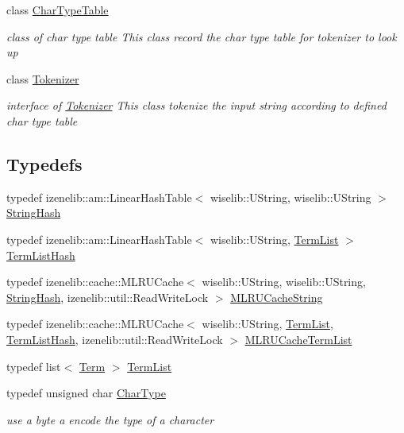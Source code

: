 \begin{CompactItemize}
class \hyperlink{classla__manager_1_1CharTypeTable}{CharTypeTable}
\begin{CompactList}\small\item\em class of char type table This class record the char type table for tokenizer to look up \item\end{CompactList}\item 
class \hyperlink{classla__manager_1_1Tokenizer}{Tokenizer}
\begin{CompactList}\small\item\em interface of \hyperlink{classla__manager_1_1Tokenizer}{Tokenizer} This class tokenize the input string according to defined char type table \item\end{CompactList}\end{CompactItemize}
\subsection*{Typedefs}
\begin{CompactItemize}
\item 
typedef izenelib::am::LinearHashTable$<$ wiselib::UString, wiselib::UString $>$ \hyperlink{namespacela__manager_b2561f2d031fc493a284cdce3afdd8fb}{StringHash}
\item 
typedef izenelib::am::LinearHashTable$<$ wiselib::UString, \hyperlink{namespacela__manager_06c0aab93982ee3ebc3ef9d0419e619a}{TermList} $>$ \hyperlink{namespacela__manager_606b1224bbc6a202c407abf718ad3835}{TermListHash}
\item 
typedef izenelib::cache::MLRUCache$<$ wiselib::UString, wiselib::UString, \hyperlink{namespacela__manager_b2561f2d031fc493a284cdce3afdd8fb}{StringHash}, izenelib::util::ReadWriteLock $>$ \hyperlink{namespacela__manager_8a93c4bd160d94957812fb620225a17e}{MLRUCacheString}
\item 
typedef izenelib::cache::MLRUCache$<$ wiselib::UString, \hyperlink{namespacela__manager_06c0aab93982ee3ebc3ef9d0419e619a}{TermList}, \hyperlink{namespacela__manager_606b1224bbc6a202c407abf718ad3835}{TermListHash}, izenelib::util::ReadWriteLock $>$ \hyperlink{namespacela__manager_2ae131a60e2247f3f26c245dac7d0c56}{MLRUCacheTermList}
\item 
typedef list$<$ \hyperlink{classla__manager_1_1Term}{Term} $>$ \hyperlink{namespacela__manager_06c0aab93982ee3ebc3ef9d0419e619a}{TermList}
\item 
typedef unsigned char \hyperlink{namespacela__manager_aa4b42b4146948a208eabd25288ad99b}{CharType}
\begin{CompactList}\small\item\em use a byte a encode the type of a character \item\end{CompactList}\end{CompactItemize}
